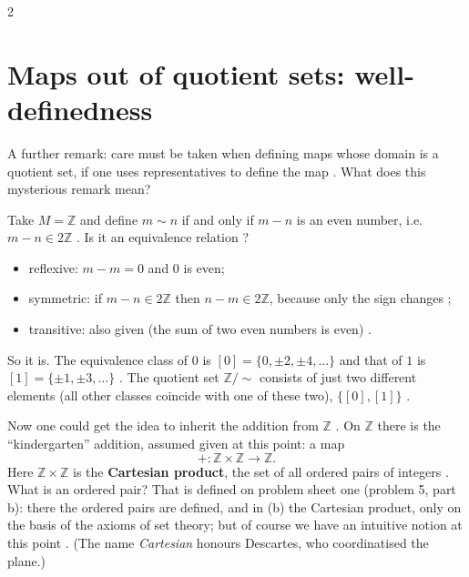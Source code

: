 \begin{paracol}{2}
\section{Maps out of quotient sets: well-definedness}\label{sec:cl-wd}

A further remark: care must be taken when defining maps whose domain is a quotient set, if one uses representatives to
define the map . What does this mysterious remark mean?

\begin{example}\label{ex:cl-mod2}
Take $M=\mathbb Z$ and define $m\sim n$ if and only if $m-n$ is an even number, i.e.\ $m-n\in2\mathbb Z$
. Is it an equivalence relation ?
\begin{itemize}
  \item reflexive: $m-m=0$ and $0$ is even;
  \item symmetric: if $m-n\in2\mathbb Z$ then $n-m\in2\mathbb Z$, because only the sign changes ;
  \item transitive: also given (the sum of two even numbers is even) .
\end{itemize}
So it is. The equivalence class of $0$ is $[0]=\{0,\pm2,\pm4,\dots\}$ and that of $1$ is $[1]=\{\pm1,\pm3,\dots\}$
. The quotient set $\mathbb Z/{\sim}$ consists of just two different elements
(all other classes coincide with one of these two), $\{[0],[1]\}$ .
\end{example}

Now one could get the idea to inherit the addition from $\mathbb Z$ . On $\mathbb Z$ there is the
``kindergarten'' addition, assumed given at this point: a map
\[
  +\colon \mathbb Z\times\mathbb Z\to\mathbb Z.
\]
Here $\mathbb Z\times\mathbb Z$ is the \textbf{Cartesian product}, the set of all ordered pairs of integers
. What is an ordered pair? That is defined on problem sheet one (problem 5, part b): there the
ordered pairs are defined, and in (b) the Cartesian product, only on the basis of the axioms of set theory; but of course
we have an intuitive notion at this point . (The name \emph{Cartesian}
honours Descartes, who coordinatised the plane.)


\end{paracol}
